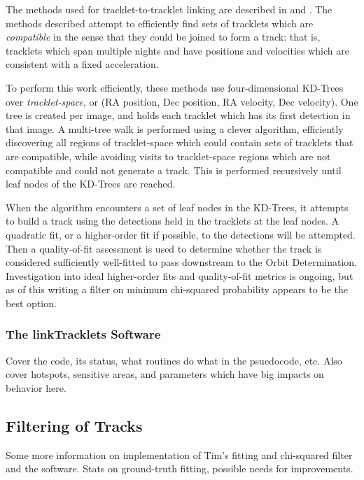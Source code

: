 The methods used for tracklet-to-tracklet linking are described in
\citet{kubica_thesis} and \citet{Kubica:2005:MTA:1081870.1081889}.
The methods described attempt to efficiently find sets of tracklets
which are \textit{compatible} in the sense that they could be joined
to form a track: that is, tracklets which span multiple nights and
have positions and velocities which are consistent with a fixed
acceleration.  

To perform this work efficiently, these methods use four-dimensional
KD-Trees over \textit{tracklet-space}, or (RA position, Dec position,
RA velocity, Dec velocity). One tree is created per image, and holds
each tracklet which has its first detection in that image.  A
multi-tree walk is performed using a clever algorithm, efficiently
discovering all regions of tracklet-space which could contain sets of
tracklets that are compatible, while avoiding visits to tracklet-space
regions which are not compatible and could not generate a track.  This
is performed recursively until leaf nodes of the KD-Trees are reached.


When the algorithm encounters a set of leaf nodes in the KD-Trees, it
attempts to build a track using the detections held in the tracklets
at the leaf nodes.  A quadratic fit, or a higher-order fit if
possible, to the detections will be attempted.  Then a quality-of-fit
assessment is used to determine whether the track is considered
sufficiently well-fitted to pass downstream to the Orbit
Determination.  Investigation into ideal higher-order fits and
quality-of-fit metrics is ongoing, but as of this writing a filter on
minimum chi-squared probability appears to be the best option.

\subsubsection{The linkTracklets Software}
Cover the code, its status, what routines do what in the psuedocode,
etc.  Also cover hotspots, sensitive areas, and parameters which have
big impacts on behavior here.


\subsection{Filtering of Tracks}
\label{trackFilters}
Some more information on implementation of Tim's fitting and
chi-squared filter and the software. Stats on ground-truth fitting,
possible needs for improvements.


